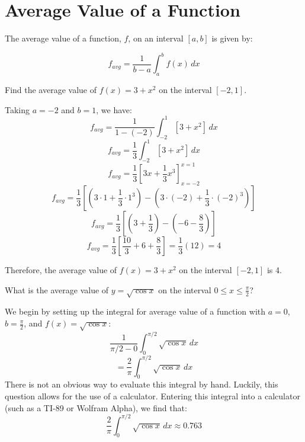 \section{Average Value of a Function}
The average value of a function, $f$, on an interval $\left[ a, b \right]$ is 
given by:
\begin{mdframed}[style=important, frametitle={Average Value of a Function}]
$$f_{avg} = \frac{1}{b - a} \int_a^b f(x)\,dx$$
\end{mdframed}

\begin{Worked}
\begin{Problem}
Find the average value of $f(x) = 3 + x^2$ on the interval 
$[-2, 1]$. 
\end{Problem}
\begin{Solution}
Taking $a = -2$ and $b = 1$, we have:
$$f_{avg} = \frac{1}{1 - (-2)} \int_{-2}^1 \left[ 3 + x^2 \right]\,dx$$
$$f_{avg} = \frac{1}{3} \int_{-2}^1 \left[ 3 + x^2 \right]\,dx$$
$$f_{avg} = \frac{1}{3} \left[3x + \frac{1}{3}x^3 \right]_{x = -2}^{x = 1}$$
$$f_{avg} = \frac{1}{3} \left[ \left( 3 \cdot 1 + \frac{1}{3} \cdot 1^3 \right) 
- \left( 3 \cdot (-2) + \frac{1}{3} \cdot (-2)^3 \right) \right]$$
$$f_{avg} = \frac{1}{3} \left[ \left(3 + \frac{1}{3} \right) - \left(-6 - 
\frac{8}{3} \right) \right]$$
$$f_{avg} = \frac{1}{3} \left[ \frac{10}{3} + 6 + \frac{8}{3} \right] = 
\frac{1}{3}(12) = 4$$

Therefore, the average value of $f(x) = 3 + x^2$ on the interval $\left[ -2, 1 
\right]$ is 4. 
\end{Solution}
\end{Worked}

\begin{Exercise} What is the average value of 
$y = \sqrt{\cos{x}}$ on the interval $0 \leq x \leq \frac{\pi}{2}$?
\end{Exercise}

\begin{Answer}[ref = func_avg]
We begin by setting up the integral for average value of a function with $a = 
0$, $b = \frac{\pi}{2}$, and $f(x) = \sqrt{\cos{x}}$:
$$\frac{1}{\pi / 2 - 0} \int_0^{\pi / 2} \sqrt{\cos{x}}\,dx$$
$$= \frac{2}{\pi} \int_0^{\pi/2} \sqrt{\cos{x}}\,dx$$
There is not an obvious way to evaluate this integral by hand. Luckily, this 
question allows for the use of a calculator. Entering this integral into a 
calculator (such as a TI-89 or Wolfram Alpha), we find that:
$$\frac{2}{\pi} \int_0^{\pi/2} \sqrt{\cos{x}}\,dx \approx 0.763 $$
\end{Answer}

